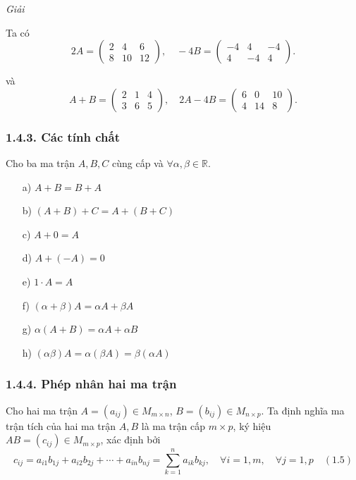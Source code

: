 \textit{Giải}

Ta có
\[
2A = \begin{pmatrix}
2 & 4 & 6 \\
8 & 10 & 12
\end{pmatrix}
, \quad
-4B = \begin{pmatrix}
-4 & 4 & -4 \\
4 & -4 & 4
\end{pmatrix}
.
\]

và
\[
A + B = \begin{pmatrix}
2 & 1 & 4 \\
3 & 6 & 5
\end{pmatrix}
, \quad
2A - 4B = \begin{pmatrix}
6 & 0 & 10 \\
4 & 14 & 8
\end{pmatrix}
.
\]

\subsubsection*{1.4.3. Các tính chất}
Cho ba ma trận \( A, B, C \) cùng cấp và \( \forall \alpha, \beta \in \mathbb{R} \).
\begin{itemize}
    \item[a)] \( A + B = B + A \)
    \item[b)] \( (A + B) + C = A + (B + C) \)
    \item[c)] \( A + 0 = A \)
    \item[d)] \( A + (-A) = 0 \)
    \item[e)] \( 1 \cdot A = A \)
    \item[f)] \( (\alpha + \beta)A = \alpha A + \beta A \)
    \item[g)] \( \alpha(A + B) = \alpha A + \alpha B \)
    \item[h)] \( (\alpha \beta)A = \alpha(\beta A) = \beta(\alpha A) \)
\end{itemize}

\subsubsection*{1.4.4. Phép nhân hai ma trận}
Cho hai ma trận \( A = (a_{ij}) \in M_{m \times n} \), \( B = (b_{ij}) \in M_{n \times p} \). Ta định nghĩa ma trận tích của hai ma trận \( A, B \) là ma trận cấp \( m \times p \), ký hiệu \( AB = (c_{ij}) \in M_{m \times p} \), xác định bởi
\[
c_{ij} = a_{i1}b_{1j} + a_{i2}b_{2j} + \cdots + a_{in}b_{nj} = \sum_{k=1}^n a_{ik}b_{kj}, \quad \forall i = 1, m, \quad \forall j = 1, p \quad (1.5)
\]

